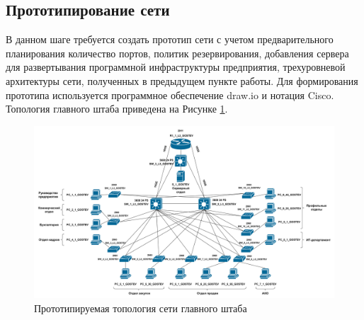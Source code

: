 \documentclass[14pt, a4paper]{extarticle}
\numberwithin{equation}{section}
\begin{document}
\newpage
\subsection{Прототипирование сети}
В данном шаге требуется создать прототип сети с учетом 
предварительного планирования количество портов, 
политик резервирования, добавления сервера для 
развертывания программной инфраструктуры предприятия, 
трехуровневой архитектуры сети, полученных в предыдущем 
пункте работы. 
Для формирования прототипа используется программное 
обеспечение draw.io и нотация Cisco. Топология главного штаба приведена на Рисунке \ref{fig:mainDepTopo}.


\begin{landscape}
\begin{figure}[H]
        \centering
        \includegraphics[scale=0.2]{topo_mainDep.png}
        \caption{Прототипируемая топология сети главного штаба}
        \label{fig:mainDepTopo}
\end{figure}
\end{landscape}
\end{document}
